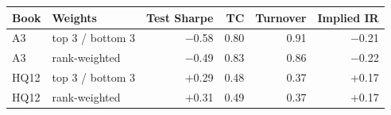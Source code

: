 \begin{tabular}{llrrrr}
\toprule
Book & Weights & Test Sharpe & TC & Turnover & Implied IR \\
\midrule
A3 & top 3 / bottom 3 & $-$0.58 & 0.80 & 0.91 & $-$0.21 \\
A3 & rank-weighted & $-$0.49 & 0.83 & 0.86 & $-$0.22 \\
HQ12 & top 3 / bottom 3 & +0.29 & 0.48 & 0.37 & +0.17 \\
HQ12 & rank-weighted & +0.31 & 0.49 & 0.37 & +0.17 \\
\bottomrule
\end{tabular}
